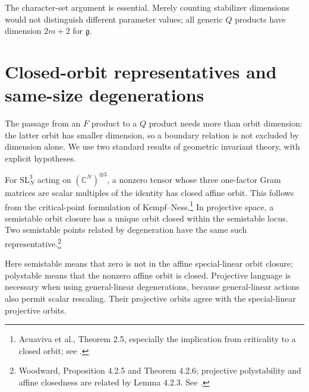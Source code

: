 \documentclass[11pt]{article}
\theoremstyle{remark}\newtheorem{remark}[theorem]{Remark}
\newcommand{\C}{\mathbb C}
\newcommand{\SL}{\mathrm{SL}}
\newcommand{\g}{\mathfrak g}
\begin{document}
The character-set argument is essential. Merely counting stabilizer dimensions would not distinguish different parameter values; all generic $Q$ products have dimension $2m+2$ for $\g$.

\section{Closed-orbit representatives and same-size degenerations}\label{sec:git}
The passage from an $F$ product to a $Q$ product needs more than orbit dimension: the latter orbit has smaller dimension, so a boundary relation is not excluded by dimension alone. We use two standard results of geometric invariant theory, with explicit hypotheses.

For $\SL_N^3$ acting on $(\C^N)^{\otimes3}$, a nonzero tensor whose three one-factor Gram matrices are scalar multiples of the identity has closed affine orbit. This follows from the critical-point formulation of Kempf--Ness.\footnote{Acuaviva et al., Theorem 2.5, especially the implication from criticality to a closed orbit; see \cite{kn}.} In projective space, a semistable orbit closure has a unique orbit closed within the semistable locus. Two semistable points related by degeneration have the same such representative.\footnote{Woodward, Proposition 4.2.5 and Theorem 4.2.6; projective polystability and affine closedness are related by Lemma 4.2.3. See \cite{woodward}.}

Here semistable means that zero is not in the affine special-linear orbit closure; polystable means that the nonzero affine orbit is closed. Projective language is necessary when using general-linear degenerations, because general-linear actions also permit scalar rescaling. Their projective orbits agree with the special-linear projective orbits.
\end{document}
